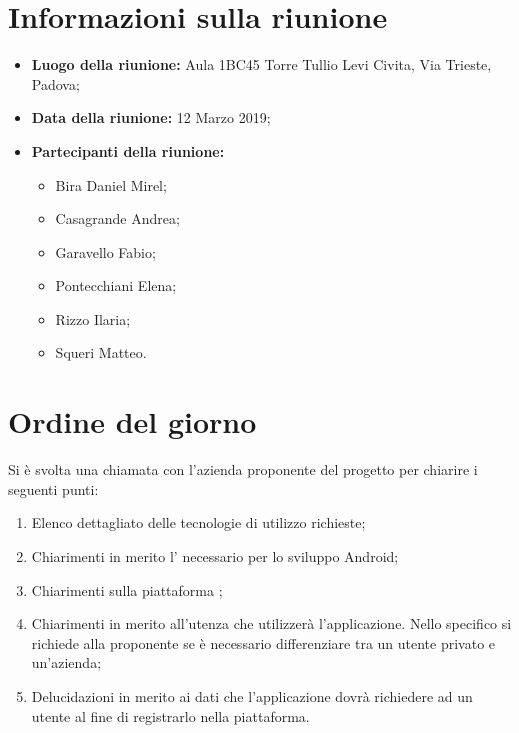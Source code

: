 \documentclass[a4paper, oneside, openany, dvipsnames, table]{article}
\begin{document}
\section{Informazioni sulla riunione}
\begin{itemize}
	\item \textbf{Luogo della riunione:} Aula 1BC45 Torre Tullio Levi Civita, Via Trieste, Padova;
	\item \textbf{Data della riunione:} 12 Marzo 2019;
	
	\item \textbf{Partecipanti della riunione:}
		\begin{itemize}
			\item Bira Daniel Mirel;
			\item Casagrande Andrea;
			\item Garavello Fabio;
			\item Pontecchiani Elena;
			\item Rizzo Ilaria;
			\item Squeri Matteo.
		\end{itemize}
\end{itemize}


	
	
	
\newpage
\section{Ordine del giorno}
Si è svolta una chiamata con l'azienda proponente del progetto per chiarire i seguenti punti:
\begin{enumerate}
	\item Elenco dettagliato delle tecnologie di utilizzo richieste;
	\item Chiarimenti in merito l'  necessario per lo sviluppo Android;
	\item Chiarimenti sulla piattaforma ;
	\item Chiarimenti in merito all'utenza che utilizzerà l'applicazione. Nello specifico si richiede alla proponente se è necessario differenziare tra un utente privato e un'azienda;
	\item Delucidazioni in merito ai dati che l'applicazione dovrà richiedere ad un utente al fine di registrarlo nella piattaforma.
	 
		
\end{enumerate}
	

\newpage
\end{document}
